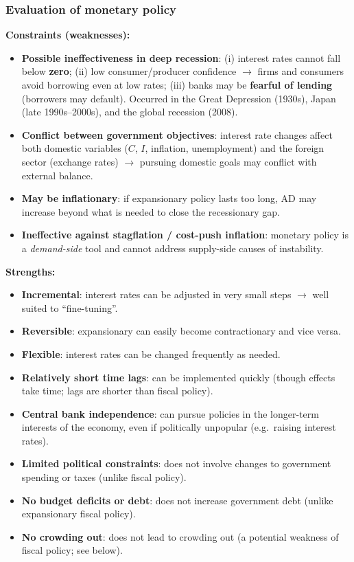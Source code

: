 \subsubsection*{Evaluation of monetary policy}
\textbf{Constraints (weaknesses):}
\begin{itemize}
  \item \textbf{Possible ineffectiveness in deep recession}: (i) interest rates cannot fall below \textbf{zero}; (ii) low consumer/producer confidence $\to$ firms and consumers avoid borrowing even at low rates; (iii) banks may be \textbf{fearful of lending} (borrowers may default). Occurred in the Great Depression (1930s), Japan (late 1990s--2000s), and the global recession (2008).
  \item \textbf{Conflict between government objectives}: interest rate changes affect both domestic variables ($C$, $I$, inflation, unemployment) and the foreign sector (exchange rates) $\to$ pursuing domestic goals may conflict with external balance.
  \item \textbf{May be inflationary}: if expansionary policy lasts too long, AD may increase beyond what is needed to close the recessionary gap.
  \item \textbf{Ineffective against stagflation / cost-push inflation}: monetary policy is a \textit{demand-side} tool and cannot address supply-side causes of instability.
\end{itemize}
\textbf{Strengths:}
\begin{itemize}
  \item \textbf{Incremental}: interest rates can be adjusted in very small steps $\to$ well suited to ``fine-tuning''.
  \item \textbf{Reversible}: expansionary can easily become contractionary and vice versa.
  \item \textbf{Flexible}: interest rates can be changed frequently as needed.
  \item \textbf{Relatively short time lags}: can be implemented quickly (though effects take time; lags are shorter than fiscal policy).
  \item \textbf{Central bank independence}: can pursue policies in the longer-term interests of the economy, even if politically unpopular (e.g.\ raising interest rates).
  \item \textbf{Limited political constraints}: does not involve changes to government spending or taxes (unlike fiscal policy).
  \item \textbf{No budget deficits or debt}: does not increase government debt (unlike expansionary fiscal policy).
  \item \textbf{No crowding out}: does not lead to crowding out (a potential weakness of fiscal policy; see below).
\end{itemize}
